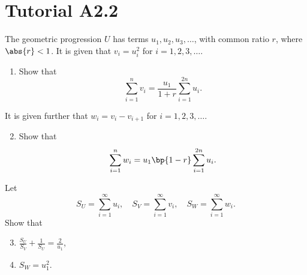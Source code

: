 \section{Tutorial A2.2}

\begin{problem}
    The geometric progression $U$ has terms $u_1, u_2, u_3, \dots$, with common ratio $r$, where $\abs{r} < 1$. It is given that $v_i = u_i^2$ for $i = 1, 2, 3, \dots$.

    \begin{enumerate}
        \item Show that \[\sum_{i = 1}^n v_i = \frac{u_1}{1 + r}\sum_{i = 1}^{2n} u_i.\]
    \end{enumerate}

    It is given further that $w_i = v_i - v_{i+1}$ for $i = 1, 2, 3, \dots$.

    \begin{enumerate}
        \setcounter{enumi}{1}
        \item Show that \[\sum_{i = 1}^n w_i = u_1 \bp{1-r} \sum_{i = 1}^{2n} u_i.\]
    \end{enumerate}

    Let \[S_U = \sum_{i = 1}^\infty u_i, \quad S_V = \sum_{i = 1}^\infty v_i, \quad S_W = \sum_{i = 1}^\infty w_i.\] Show that
    \begin{enumerate}
        \setcounter{enumi}{2}
        \item $\displaystyle\frac{S_U}{S_V} + \frac1{S_U} = \frac2{u_1}$,
        \item $S_W = u_1^2$.
    \end{enumerate}
\end{problem}
